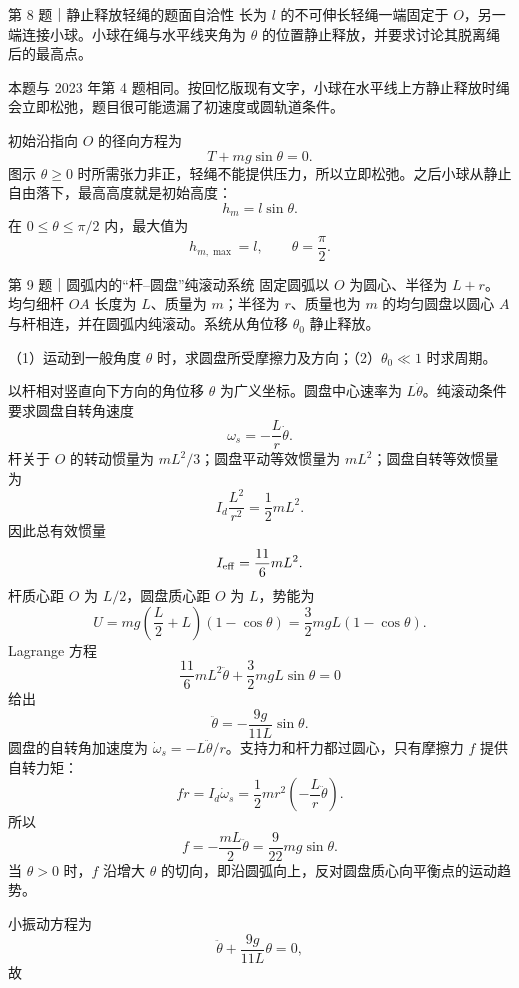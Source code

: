 \begin{problem}{第 8 题｜静止释放轻绳的题面自洽性}
长为 $l$ 的不可伸长轻绳一端固定于 $O$，另一端连接小球。小球在绳与水平线夹角为 $\theta$ 的位置静止释放，并要求讨论其脱离绳后的最高点。
\FigPendulumSlack
\end{problem}
\begin{identification}
本题与 2023 年第 4 题相同。按回忆版现有文字，小球在水平线上方静止释放时绳会立即松弛，题目很可能遗漏了初速度或圆轨道条件。
\end{identification}
\begin{solution}
初始沿指向 $O$ 的径向方程为
\[
T+mg\sin\theta=0.
\]
图示 $\theta\ge0$ 时所需张力非正，轻绳不能提供压力，所以立即松弛。之后小球从静止自由落下，最高高度就是初始高度：
\[
h_m=l\sin\theta.
\]
在 $0\le\theta\le\pi/2$ 内，最大值为
\[
h_{m,\max}=l,
\qquad \theta=\frac\pi2.
\]
\end{solution}

\begin{problem}{第 9 题｜圆弧内的“杆--圆盘”纯滚动系统}
固定圆弧以 $O$ 为圆心、半径为 $L+r$。均匀细杆 $OA$ 长度为 $L$、质量为 $m$；半径为 $r$、质量也为 $m$ 的均匀圆盘以圆心 $A$ 与杆相连，并在圆弧内纯滚动。系统从角位移 $\theta_0$ 静止释放。

（1）运动到一般角度 $\theta$ 时，求圆盘所受摩擦力及方向；（2）$\theta_0\ll1$ 时求周期。
\FigRodDisk
\end{problem}
\begin{solution}
以杆相对竖直向下方向的角位移 $\theta$ 为广义坐标。圆盘中心速率为 $L\dot\theta$。纯滚动条件要求圆盘自转角速度
\[
\omega_s=-\frac Lr\dot\theta.
\]
杆关于 $O$ 的转动惯量为 $mL^2/3$；圆盘平动等效惯量为 $mL^2$；圆盘自转等效惯量为
\[
I_d\frac{L^2}{r^2}=\frac12mL^2.
\]
因此总有效惯量
\[
I_{\rm eff}=\frac{11}{6}mL^2.
\]
杆质心距 $O$ 为 $L/2$，圆盘质心距 $O$ 为 $L$，势能为
\[
U=mg\left(\frac L2+L\right)(1-\cos\theta)
=\frac32mgL(1-\cos\theta).
\]
Lagrange 方程
\[
\frac{11}{6}mL^2\ddot\theta+\frac32mgL\sin\theta=0
\]
给出
\[
\ddot\theta=-\frac{9g}{11L}\sin\theta.
\]
圆盘的自转角加速度为 $\dot\omega_s=-L\ddot\theta/r$。支持力和杆力都过圆心，只有摩擦力 $f$ 提供自转力矩：
\[
fr=I_d\dot\omega_s
=\frac12mr^2\left(-\frac Lr\ddot\theta\right).
\]
所以
\[
\boxed{f=-\frac{mL}{2}\ddot\theta=\frac{9}{22}mg\sin\theta}.
\]
当 $\theta>0$ 时，$f$ 沿增大 $\theta$ 的切向，即沿圆弧向上，反对圆盘质心向平衡点的运动趋势。

小振动方程为
\[
\ddot\theta+\frac{9g}{11L}\theta=0,
\]
故
\end{solution}
